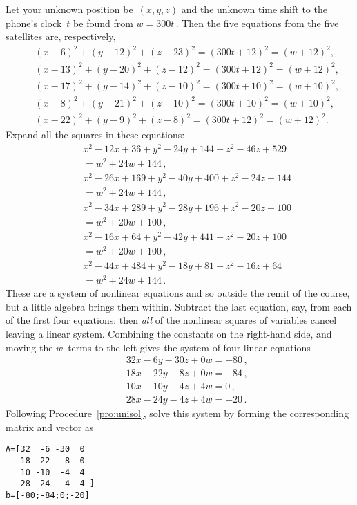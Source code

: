 \begin{example}
\begin{solution} 
Let your unknown position be~\((x,y,z)\) and the unknown time shift to the phone's clock~\(t\) be found from \(w=300t\)\,.
Then the five equations from the five satellites are, respectively,
\begin{eqnarray*}
&&(x-6)^2+(y-12)^2+(z-23)^2=(300t+12)^2=(w+12)^2,
\\&&(x-13)^2+(y-20)^2+(z-12)^2=(300t+12)^2=(w+12)^2,
\\&&(x-17)^2+(y-14)^2+(z-10)^2=(300t+10)^2=(w+10)^2,
\\&&(x-8)^2+(y-21)^2+(z-10)^2=(300t+10)^2=(w+10)^2,
\\&&(x-22)^2+(y-9)^2+(z-8)^2=(300t+12)^2=(w+12)^2.
\end{eqnarray*}
Expand all the squares in these equations:
\begin{eqnarray*}
&&x^2-12x+36+y^2-24y+144+z^2-46z+529\\&&{}=w^2+24w+144\,,
\\&&x^2-26x+169+y^2-40y+400+z^2-24z+144\\&&{}=w^2+24w+144\,,
\\&&x^2-34x+289+y^2-28y+196+z^2-20z+100\\&&{}=w^2+20w+100\,,
\\&&x^2-16x+64+y^2-42y+441+z^2-20z+100\\&&{}=w^2+20w+100\,,
\\&&x^2-44x+484+y^2-18y+81+z^2-16z+64\\&&{}=w^2+24w+144\,.
\end{eqnarray*}
These are a system of nonlinear equations and so outside the remit of the course, but a little algebra brings them within.
Subtract the last equation, say, from each of the first four equations: then \emph{all} of the nonlinear squares of variables cancel leaving a linear system.
Combining the constants on the right-hand side, and moving the \(w\)~terms to the left gives the system of four linear equations
\begin{eqnarray*}
&&32x-6y-30z+0w=-80\,,
\\&&18x-22y-8z+0w=-84\,,
\\&&10x-10y-4z+4w=0\,,
\\&&28x-24y-4z+4w=-20\,.
\end{eqnarray*}
Following Procedure~\ref{pro:unisol}, solve this system by forming the corresponding matrix and vector as
\begin{verbatim}
A=[32  -6 -30  0
   18 -22  -8  0
   10 -10  -4  4
   28 -24  -4  4 ]
b=[-80;-84;0;-20]
\end{verbatim}

\end{solution}
\end{example}
